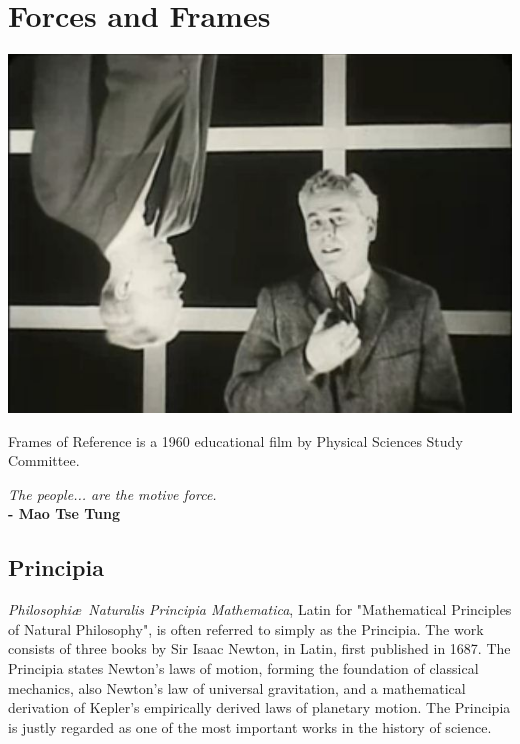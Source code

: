 \chapter{Forces and Frames}
\begin{marginfigure}%
  \includegraphics[width=\linewidth]{Frames.jpg}
  \caption{Frames of Reference is a 1960 educational film by Physical Sciences Study Committee.}
  \label{fig:marginfig}
\end{marginfigure}
\textit{The people... are the motive force.}  \\
\noindent\textbf{-  Mao Tse Tung}
\vspace{1cm}


\section{Principia}
\textit{Philosophi\ae \ Naturalis Principia Mathematica}, Latin for "Mathematical Principles of Natural Philosophy", is often referred to simply as the Principia.  The work consists of three books by Sir Isaac Newton, in Latin, first published in 1687.  The Principia states Newton's laws of motion, forming the foundation of classical mechanics, also Newton's law of universal gravitation, and a mathematical derivation of Kepler's empirically derived laws of planetary motion. The Principia is justly regarded as one of the most important works in the history of science.

